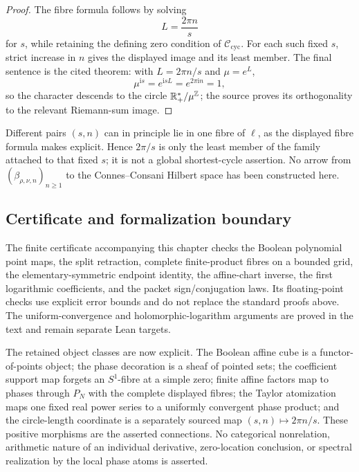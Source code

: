 \begin{proof}
The fibre formula follows by solving
\[
 L=\frac{2\pi n}{s}
\]
for \(s\), while retaining the defining zero condition of
\(\mathcal C_{\mathrm{cyc}}\).
For each such fixed \(s\), strict increase in \(n\) gives the displayed image and
its least member.  The final sentence is the cited theorem: with
\(L=2\pi n/s\) and \(\mu=e^L\),
\[
 \mu^{\mathrm is}=e^{\mathrm isL}=e^{2\pi\mathrm in}=1,
\]
so the character descends to the circle
\(\mathbb R_+^*/\mu^{\mathbb Z}\); the source proves its orthogonality to the relevant
Riemann-sum image.
\end{proof}

Different pairs \((s,n)\) can in principle lie in one fibre of \(\ell\), as the
displayed fibre formula makes explicit.  Hence \(2\pi/s\) is only the least
member of the family attached to that fixed \(s\); it is not a global
shortest-cycle assertion.  No arrow from
\((\beta_{\rho,\nu,n})_{n\geq1}\) to the Connes--Consani Hilbert space has been
constructed here.

\subsection{Certificate and formalization boundary}

The finite certificate accompanying this chapter checks the Boolean polynomial
point maps, the split retraction, complete finite-product fibres on a bounded
grid, the elementary-symmetric endpoint identity, the affine-chart inverse,
the first logarithmic coefficients, and the packet sign/conjugation laws.  Its
floating-point checks use explicit error bounds and do not replace the standard
proofs above.  The uniform-convergence and holomorphic-logarithm arguments are
proved in the text and remain separate Lean targets.

The retained object classes are now explicit.  The Boolean affine cube is a
functor-of-points object; the phase decoration is a sheaf of pointed sets; the
coefficient support map forgets an \(S^1\)-fibre at a simple zero; finite affine
factors map to phases through \(P_N\) with the complete displayed fibres; the
Taylor atomization maps one fixed real power series to a uniformly convergent
phase product; and the circle-length coordinate is a separately sourced map
\((s,n)\mapsto2\pi n/s\).  These positive morphisms are the asserted
connections.  No categorical nonrelation, arithmetic nature of an individual
derivative, zero-location conclusion, or spectral realization by the local
phase atoms is asserted.

